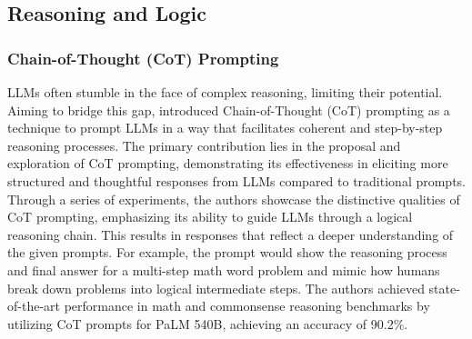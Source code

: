 \documentclass{article}
\begin{document}


\subsection{Reasoning and Logic}
\label{ral}
\subsubsection{Chain-of-Thought (CoT) Prompting} 
\label{cot}
LLMs often stumble in the face of complex reasoning, limiting their potential. Aiming to bridge this gap, \cite{wei2022chain} introduced Chain-of-Thought (CoT) prompting as a technique to prompt LLMs in a way that facilitates coherent and step-by-step reasoning processes. The primary contribution lies in the proposal and exploration of CoT prompting, demonstrating its effectiveness in eliciting more structured and thoughtful responses from LLMs compared to traditional prompts. Through a series of experiments, the authors showcase the distinctive qualities of CoT prompting, emphasizing its ability to guide LLMs through a logical reasoning chain. This results in responses that reflect a deeper understanding of the given prompts. For example, the prompt would show the reasoning process and final answer for a multi-step math word problem and mimic how humans break down problems into logical intermediate steps. The authors achieved state-of-the-art performance in math and commonsense reasoning benchmarks by utilizing CoT prompts for PaLM 540B, achieving an accuracy of 90.2\%.

\end{document}
